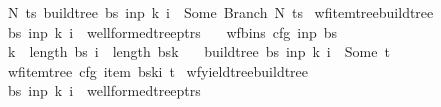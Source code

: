 \begin{isabellebody}
\ \ \ {\isachardoublequoteopen}{\isasymexists}N\ ts{\isachardot}{\kern0pt}\ build{\isacharunderscore}{\kern0pt}tree{\isacharprime}{\kern0pt}\ bs\ inp\ k\ i\ {\isacharequal}{\kern0pt}\ Some\ {\isacharparenleft}{\kern0pt}Branch\ N\ ts{\isacharparenright}{\kern0pt}{\isachardoublequoteclose}%
\isadelimproof
%
\endisadelimproof
%
\isatagproof
%
\endisatagproof
{\isafoldproof}%
%
\isadelimproof
\isanewline
%
\endisadelimproof
{}\isamarkupfalse%
\ wf{\isacharunderscore}{\kern0pt}item{\isacharunderscore}{\kern0pt}tree{\isacharunderscore}{\kern0pt}build{\isacharunderscore}{\kern0pt}tree{\isacharprime}{\kern0pt}{\isacharcolon}{\kern0pt}\isanewline
\ \ \ {\isachardoublequoteopen}{\isacharparenleft}{\kern0pt}bs{\isacharcomma}{\kern0pt}\ inp{\isacharcomma}{\kern0pt}\ k{\isacharcomma}{\kern0pt}\ i{\isacharparenright}{\kern0pt}\ {\isasymin}\ wellformed{\isacharunderscore}{\kern0pt}tree{\isacharunderscore}{\kern0pt}ptrs{\isachardoublequoteclose}\isanewline
\ \ \ {\isachardoublequoteopen}wf{\isacharunderscore}{\kern0pt}bins\ cfg\ inp\ bs{\isachardoublequoteclose}\isanewline
\ \ \ {\isachardoublequoteopen}k\ {\isacharless}{\kern0pt}\ length\ bs{\isachardoublequoteclose}\ {\isachardoublequoteopen}i\ {\isacharless}{\kern0pt}\ length\ {\isacharparenleft}{\kern0pt}bs{\isacharbang}{\kern0pt}k{\isacharparenright}{\kern0pt}{\isachardoublequoteclose}\isanewline
\ \ \ {\isachardoublequoteopen}build{\isacharunderscore}{\kern0pt}tree{\isacharprime}{\kern0pt}\ bs\ inp\ k\ i\ {\isacharequal}{\kern0pt}\ Some\ t{\isachardoublequoteclose}\isanewline
\ \ \ {\isachardoublequoteopen}wf{\isacharunderscore}{\kern0pt}item{\isacharunderscore}{\kern0pt}tree\ cfg\ {\isacharparenleft}{\kern0pt}item\ {\isacharparenleft}{\kern0pt}bs{\isacharbang}{\kern0pt}k{\isacharbang}{\kern0pt}i{\isacharparenright}{\kern0pt}{\isacharparenright}{\kern0pt}\ t{\isachardoublequoteclose}%
\isadelimproof
%
\endisadelimproof
%
\isatagproof
%
\endisatagproof
{\isafoldproof}%
%
\isadelimproof
\isanewline
%
\endisadelimproof
{}\isamarkupfalse%
\ wf{\isacharunderscore}{\kern0pt}yield{\isacharunderscore}{\kern0pt}tree{\isacharunderscore}{\kern0pt}build{\isacharunderscore}{\kern0pt}tree{\isacharprime}{\kern0pt}{\isacharcolon}{\kern0pt}\isanewline
\ \ \ {\isachardoublequoteopen}{\isacharparenleft}{\kern0pt}bs{\isacharcomma}{\kern0pt}\ inp{\isacharcomma}{\kern0pt}\ k{\isacharcomma}{\kern0pt}\ i{\isacharparenright}{\kern0pt}\ {\isasymin}\ wellformed{\isacharunderscore}{\kern0pt}tree{\isacharunderscore}{\kern0pt}ptrs{\isachardoublequoteclose}\isanewline

\end{isabellebody}

